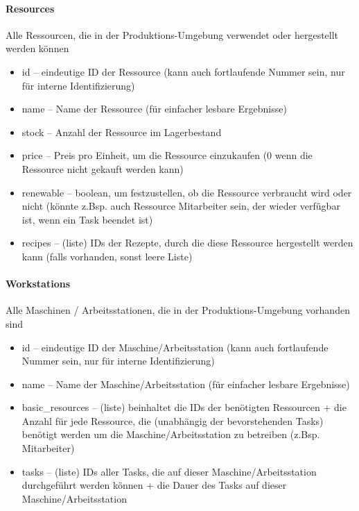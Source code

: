 \documentclass[a4paper,12pt,twoside]{scrreprt}
\begin{document}
\paragraph*{Resources}
Alle Ressourcen, die in der Produktions-Umgebung verwendet oder hergestellt werden können
\begin{itemize}
	\item id – eindeutige ID der Ressource (kann auch fortlaufende Nummer sein, nur für interne Identifizierung)
	\item name – Name der Ressource (für einfacher lesbare Ergebnisse)
	\item stock – Anzahl der Ressource im Lagerbestand
	\item price – Preis pro Einheit, um die Ressource einzukaufen (0 wenn die Ressource nicht gekauft werden kann)
	\item renewable – boolean, um festzustellen, ob die Ressource verbraucht wird oder nicht (könnte z.Bsp. auch Ressource Mitarbeiter sein, der wieder verfügbar ist, wenn ein Task beendet ist)
	\item recipes – (liste) IDs der Rezepte, durch die diese Ressource hergestellt werden kann (falls vorhanden, sonst leere Liste)
\end{itemize}
\paragraph*{Workstations}
Alle Maschinen / Arbeitsstationen, die in der Produktions-Umgebung vorhanden sind
\begin{itemize}
	\item id – eindeutige ID der Maschine/Arbeitsstation (kann auch fortlaufende Nummer sein, nur für interne Identifizierung)
	\item name – Name der Maschine/Arbeitsstation (für einfacher lesbare Ergebnisse)
	\item basic\_resources – (liste) beinhaltet die IDs der benötigten Ressourcen + die Anzahl für jede Ressource, die (unabhängig der bevorstehenden Tasks) benötigt werden um die Maschine/Arbeitsstation zu betreiben (z.Bsp. Mitarbeiter)
	\item tasks – (liste) IDs aller Tasks, die auf dieser Maschine/Arbeitsstation durchgeführt werden können + die Dauer des Tasks auf dieser Maschine/Arbeitsstation
\end{itemize}
\end{document}
